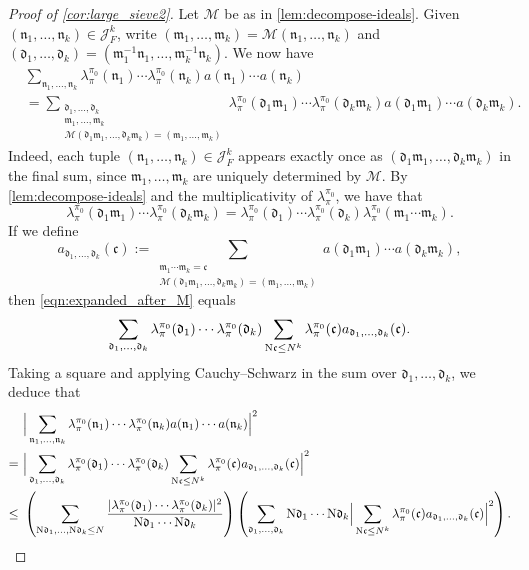 \documentclass[11pt]{amsart}
\theoremstyle{remark}
\numberwithin{equation}{section}
\newcommand{\kc}{\mathfrak{c}}
\newcommand{\kd}{\mathfrak{d}}
\newcommand{\km}{\mathfrak{m}}
\newcommand{\kn}{\mathfrak{n}}
\newcommand{\N}{\textnormal{N}}
\newcommand{\mJ}{\mathcal{J}}
\begin{document}
\begin{proof}[Proof of \cref{cor:large_sieve2}]
Let $\mathscr{M}$ be as in \cref{lem:decompose-ideals}.  Given $(\kn_1,\ldots,\kn_k)\in \mJ_F^k$, write $(\km_1,\ldots,\km_k)=\mathscr{M}(\kn_1,\ldots,\kn_k)$ and $(\kd_1,\ldots,\kd_k)=(\km_1^{-1}\kn_1,\ldots,\km_k^{-1}\kn_k)$.  We now have
\begin{equation}
\label{eqn:expanded_after_M}
\begin{aligned}
   & \sum_{\kn_1, \ldots, \kn_k} \lambda^{\pi_0}_{\pi}(\kn_1) \cdots \lambda^{\pi_0}_{\pi}(\kn_k) a(\kn_1) \cdots a(\kn_k)\\
&= \sum_{\substack{\kd_1, \ldots, \kd_k \\ \km_1, \ldots, \km_k \\  \mathscr{M}(\kd_1\km_1, \ldots, \kd_k\km_k) = (\km_1, \ldots, \km_k)}}
    \lambda^{\pi_0}_{\pi}(\kd_1\km_1) \cdots \lambda^{\pi_0}_{\pi}(\kd_k\km_k) a(\kd_1\km_1) \cdots a(\kd_k\km_k).
\end{aligned}
\end{equation}
Indeed, each tuple $(\kn_1, \ldots, \kn_k) \in \mJ_F^k$ appears exactly once as $(\kd_1\km_1, \ldots, \kd_k\km_k)$ in the final sum, since $\km_1, \ldots, \km_k$ are uniquely determined by $\mathscr{M}$. By \cref{lem:decompose-ideals} and the multiplicativity of $\lambda^{\pi_0}_\pi$, we have that
\[
\lambda^{\pi_0}_{\pi}(\kd_1\km_1) \cdots \lambda^{\pi_0}_{\pi}(\kd_k\km_k) = \lambda^{\pi_0}_\pi(\kd_1) \cdots \lambda^{\pi_0}_\pi(\kd_k) \lambda^{\pi_0}_\pi(\km_1\cdots\km_k).
\]
If we define
\begin{equation} \label{eqn:ak-def}
    a_{\kd_1,\ldots,\kd_k}(\kc) := \sum_{\substack{\km_1 \cdots \km_k = \kc \\ \mathscr{M}(\kd_1\km_1, \ldots, \kd_k\km_k) = (\km_1, \ldots, \km_k)}} a(\kd_1\km_1) \cdots a(\kd_k\km_k),
\end{equation}
then \eqref{eqn:expanded_after_M} equals
\[
\sum_{\kd_1, \ldots, \kd_k}
    \lambda^{\pi_0}_\pi(\kd_1) \cdots \lambda^{\pi_0}_\pi(\kd_k)
    \sum_{\N\kc \le N^k}
    \lambda^{\pi_0}_\pi(\kc) 
    a_{\kd_1,\ldots,\kd_k}(\kc).
\]
Taking a square and applying Cauchy--Schwarz in the sum over $\kd_1, \ldots, \kd_k$, we deduce that
\begin{equation} \label{eqn:squared-holder-sum}
\begin{aligned}
    &\Big\vert \sum_{\kn_1, \ldots, \kn_k} \lambda^{\pi_0}_{\pi}(\kn_1) \cdots \lambda^{\pi_0}_{\pi}(\kn_k) a(\kn_1) \cdots a(\kn_k) \Big\vert^2
    \\
    =\
    &\Big\vert \sum_{\kd_1, \ldots, \kd_k}
    \lambda^{\pi_0}_\pi(\kd_1) \cdots \lambda^{\pi_0}_\pi(\kd_k)
    \sum_{\N\kc \le N^k}
    \lambda^{\pi_0}_\pi(\kc) 
    a_{\kd_1,\ldots,\kd_k}(\kc) \Big\vert^2 
    \\
    \le\ 
    &\left(\sum_{\N \kd_1, \ldots, \N \kd_k \le N}
    \frac{|\lambda^{\pi_0}_\pi(\kd_1) \cdots \lambda^{\pi_0}_\pi(\kd_k)|^2}{\N\kd_1 \cdots \N\kd_k}
    \right)
    \left( 
    \sum_{\kd_1, \ldots, \kd_k} \N\kd_1 \cdots \N\kd_k
    \Big\vert 
    \sum_{\N\kc \le N^k}
    \lambda^{\pi_0}_\pi(\kc) 
    a_{\kd_1,\ldots,\kd_k}(\kc) \Big\vert^2 \right).
\end{aligned}
\end{equation}


\end{proof}
\end{document}
